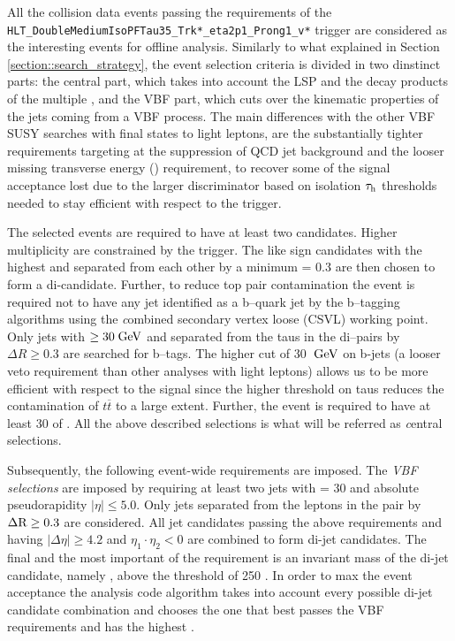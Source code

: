 All the collision data events passing the requirements of the \texttt{HLT\_\-DoubleMedium\-Iso\-PFTau35\_\-Trk*\_\-eta2p1\_\-Prong1\_\-v*} trigger are considered as the interesting events for offline analysis. Similarly to what explained in Section \ref{section::search_strategy}, the event selection criteria is divided in two dinstinct parts: the central part, which takes into account the LSP and the decay products of the multiple \hadtau, and the VBF part, which cuts over the kinematic properties of the jets coming from a VBF process. The main differences with the other VBF SUSY searches with final states to light leptons, are the substantially tighter \hadtau requirements targeting at the suppression of QCD jet background and the looser missing transverse energy (\met) requirement, to recover some of the signal acceptance lost due to the larger discriminator based on isolation $\tau_{\text{h}}$ \pt thresholds needed to stay efficient with respect to the trigger.  

The selected events are required to have at least two \hadtau candidates. Higher multiplicity \hadtau are constrained by the trigger. The like sign \hadtau candidates with the highest \pt and separated from each other by a minimum \deltar = 0.3 are then chosen to form a di-\hadtau candidate. 
Further, to reduce top pair contamination the event is required not to have any jet identified as a b--quark jet by the b--tagging algorithms using the {\textit combined secondary vertex loose} (CSVL) working point. Only jets with \pt $\ge 30 \;\text{Ge}\kern-0.06667em\text{V}$ and separated from the taus in the di--\hadtau pairs by $\Delta R \ge 0.3$ are searched for b--tags. The higher \pt cut of 30 $\;\text{Ge}\kern-0.06667em\text{V}$ on b-jets (a looser veto requirement than other analyses with light leptons) allows us to be more efficient with respect to the signal since the higher \pt threshold on taus reduces the contamination of $t\overline{t}$ to a large extent. Further, the event is required to have at least 30 \gev of \met. All the above described selections is what will be referred as {\textit central selections}.

Subsequently, the following event-wide requirements are imposed. The {\textit {VBF selections}} are imposed by requiring at least two jets with \pt = 30 \gev and absolute pseudorapidity $|\eta| \le 5.0$. Only jets separated from the leptons in the \hadtau\hadtau pair by $\Delta \text{R} \ge 0.3$ are considered. All jet candidates passing the above requirements and having $\vert \Delta\eta \vert \ge 4.2$ and $\eta_{1}\cdot\eta_{2} < 0$ are combined to form di-jet candidates. The final and the most important of the requirement is an invariant mass of the di-jet candidate, namely \mjj, above the threshold of 250 \gev. In order to max the event acceptance the analysis code algorithm takes into account every possible di-jet candidate combination and chooses the one that best passes the VBF requirements and has the highest \mjj. 

